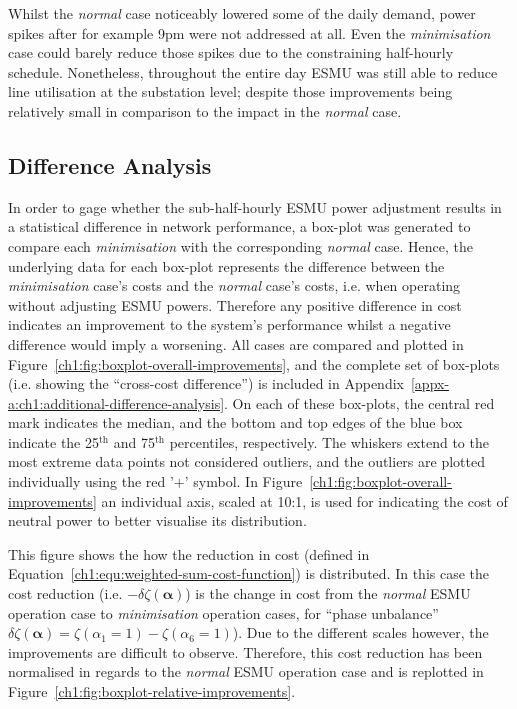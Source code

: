 

Whilst the \textit{normal} case noticeably lowered some of the daily demand, power spikes after for example 9pm were not addressed at all.
Even the \textit{minimisation} case could barely reduce those spikes due to the constraining half-hourly schedule.
Nonetheless, throughout the entire day ESMU was still able to reduce line utilisation at the substation level; despite those improvements being relatively small in comparison to the impact in the \textit{normal} case.

\subsection{Difference Analysis}
\label{ch1:subsec:difference-analysis}

In order to gage whether the sub-half-hourly ESMU power adjustment results in a statistical difference in network performance, a box-plot was generated to compare each \textit{minimisation} with the corresponding \textit{normal} case.
Hence, the underlying data for each box-plot represents the difference between the \textit{minimisation} case's costs and the \textit{normal} case's costs, i.e. when operating without adjusting ESMU powers.
Therefore any positive difference in cost indicates an improvement to the system's performance whilst a negative difference would imply a worsening.
All cases are compared and plotted in Figure~\ref{ch1:fig:boxplot-overall-improvements}, and the complete set of box-plots (i.e. showing the ``cross-cost difference'') is included in Appendix~\ref{appx-a:ch1:additional-difference-analysis}.
On each of these box-plots, the central red mark indicates the median, and the bottom and top edges of the blue box indicate the 25$^\text{th}$ and 75$^\text{th}$ percentiles, respectively.
The whiskers extend to the most extreme data points not considered outliers, and the outliers are plotted individually using the red '$+$' symbol.
In Figure~\ref{ch1:fig:boxplot-overall-improvements} an individual axis, scaled at 10:1, is used for indicating the cost of neutral power to better visualise its distribution.



This figure shows the how the reduction in cost (defined in Equation~\ref{ch1:equ:weighted-sum-cost-function}) is distributed.
In this case the cost reduction (i.e. $-\delta\zeta(\boldsymbol{\alpha})$) is the change in cost from the \textit{normal} ESMU operation case to \textit{minimisation} operation cases, for ``phase unbalance'' $\delta\zeta(\boldsymbol{\alpha}) = \zeta(\alpha_1 = 1) - \zeta(\alpha_6 = 1)$).
Due to the different scales however, the improvements are difficult to observe.
Therefore, this cost reduction has been normalised in regards to the \textit{normal} ESMU operation case and is replotted in Figure~\ref{ch1:fig:boxplot-relative-improvements}.

